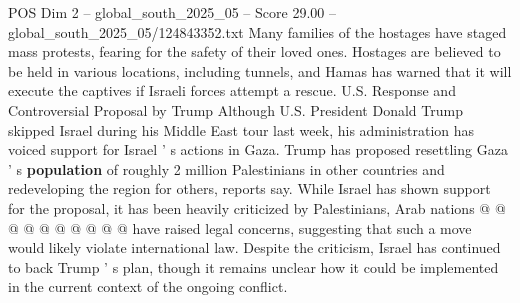 \begin{textsample}{POS Dim 2 – global\_south\_2025\_05 – Score 29.00 – global\_south\_2025\_05/124843352.txt}
Many families of the hostages have staged mass protests, fearing for the safety of their loved ones.
Hostages are believed to be held in various locations, including tunnels, and Hamas has warned that it will execute the captives if Israeli forces attempt a rescue.
U.S.
Response and Controversial Proposal by Trump Although U.S.
President Donald Trump skipped Israel during his Middle East tour last week, his administration has voiced support for Israel ' s actions in Gaza.
Trump has proposed resettling Gaza ' s \textbf{population} of roughly 2 million Palestinians in other countries and redeveloping the region for others, reports say.
While Israel has shown support for the proposal, it has been heavily criticized by Palestinians, Arab nations @ @ @ @ @ @ @ @ @ @ have raised legal concerns, suggesting that such a move would likely violate international law.
Despite the criticism, Israel has continued to back Trump ' s plan, though it remains unclear how it could be implemented in the current context of the ongoing conflict.

\end{textsample}
